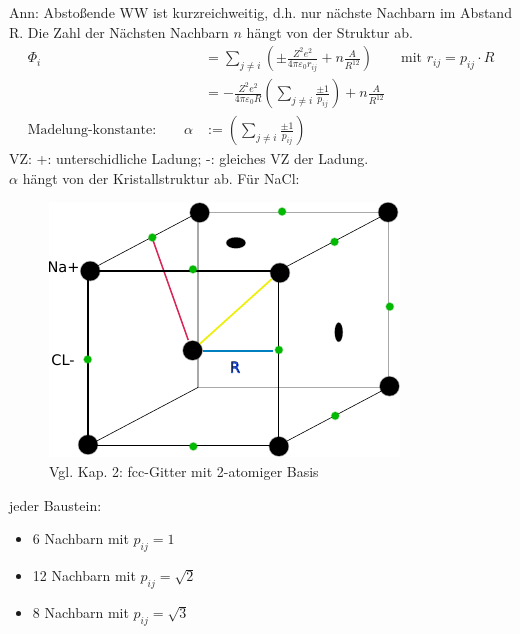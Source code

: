 	Ann: Abstoßende WW ist kurzreichweitig, d.h. nur nächste Nachbarn im Abstand R. Die Zahl der Nächsten Nachbarn $n$ hängt von der Struktur ab.
	\begin{align*}
		\Phi_i                                   & = \sum_{j \neq i} \left(\pm \frac{Z^2 e^2}{4 \pi \varepsilon_0 r_{ij}} + n\frac{A}{R^{12}}\right)
		\qquad \text{mit } r_{ij} = p_{ij} \cdot R                                                                                                                 \\
												& = - \frac{Z^2 e^2}{4 \pi \varepsilon_0 R} \left(\sum_{j \neq i} \frac{\pm 1}{p_{ij}}\right) + n\frac{A}{R^{12}} \\
		\text{Madelung-konstante:} \qquad \alpha & := \left(\sum_{j \neq i} \frac{\pm 1}{p_{ij}}\right)
	\end{align*}
	VZ: +: unterschidliche Ladung; -: gleiches VZ der Ladung.\\
	$\alpha$ hängt von der Kristallstruktur ab. Für NaCl:
	\begin{figure}
		\centering
		\includegraphics{figures/1_3NaCl.pdf}
		\caption{Vgl. Kap. 2: fcc-Gitter mit 2-atomiger Basis}
	\end{figure}
	jeder Baustein:
	\begin{itemize}
		\item 6 Nachbarn mit $p_{ij} =  1$
		\item 12 Nachbarn mit $p_{ij} =  \sqrt{2}$
		\item 8 Nachbarn mit $p_{ij} =  \sqrt{3}$
	\end{itemize}


